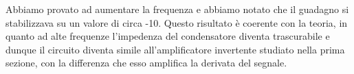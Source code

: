 Abbiamo provato ad aumentare la frequenza e abbiamo notato che il guadagno si stabilizzava su un valore di circa -10.
Questo risultato è coerente con la teoria, in quanto ad alte frequenze l'impedenza del condensatore diventa trascurabile e dunque il circuito diventa simile all'amplificatore invertente studiato nella prima sezione, con la differenza che esso amplifica la derivata del segnale.